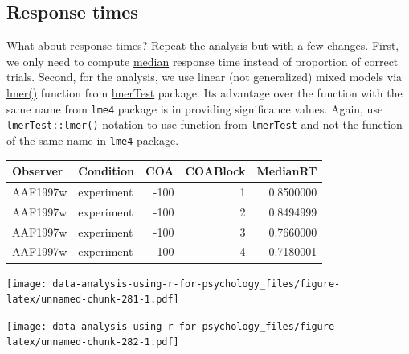 \documentclass[
]{book}
\begin{document}
\hypertarget{response-times}{%
\subsection*{Response times}\label{response-times}}

What about response times? Repeat the analysis but with a few changes. First, we only need to compute \href{https://stat.ethz.ch/R-manual/R-devel/library/stats/html/median.html}{median} response time instead of proportion of correct trials. Second, for the analysis, we use linear (not generalized) mixed models via \href{https://www.rdocumentation.org/packages/lmerTest/versions/2.0-36/topics/lmer}{lmer()} function from \href{https://github.com/runehaubo/lmerTestR}{lmerTest} package. Its advantage over the function with the same name from \texttt{lme4} package is in providing significance values. Again, use \texttt{lmerTest::lmer()} notation to use function from \texttt{lmerTest} and not the function of the same name in \texttt{lme4} package.

\begin{tabular}{l|l|r|r|r}
\hline
Observer & Condition & COA & COABlock & MedianRT\\
\hline
AAF1997w & experiment & -100 & 1 & 0.8500000\\
\hline
AAF1997w & experiment & -100 & 2 & 0.8494999\\
\hline
AAF1997w & experiment & -100 & 3 & 0.7660000\\
\hline
AAF1997w & experiment & -100 & 4 & 0.7180001\\
\hline
\end{tabular}

\texttt{[image: data-analysis-using-r-for-psychology\_files/figure-latex/unnamed-chunk-281-1.pdf]}

\texttt{[image: data-analysis-using-r-for-psychology\_files/figure-latex/unnamed-chunk-282-1.pdf]}
\end{document}
